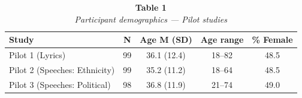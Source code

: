 \documentclass[
  man]{apa7}
\begin{document}
\begin{table}
\caption*{
{\large \textbf{Table 1}} \\ 
{\small \emph{Participant demographics --- Pilot studies}}
} 
\fontsize{9.0pt}{10.8pt}\selectfont
\begin{tabular*}{\linewidth}{@{\extracolsep{\fill}}lcccc}
\toprule
Study & N & Age M (SD) & Age range & \% Female \\ 
\midrule\addlinespace[2.5pt]
Pilot 1 (Lyrics) & 99 & 36.1 (12.4) & 18–82 & 48.5 \\ 
Pilot 2 (Speeches: Ethnicity) & 99 & 35.2 (11.2) & 18–64 & 48.5 \\ 
Pilot 3 (Speeches: Political) & 98 & 36.8 (11.9) & 21–74 & 49.0 \\ 
\bottomrule
\end{tabular*}
\end{table}
\end{document}
